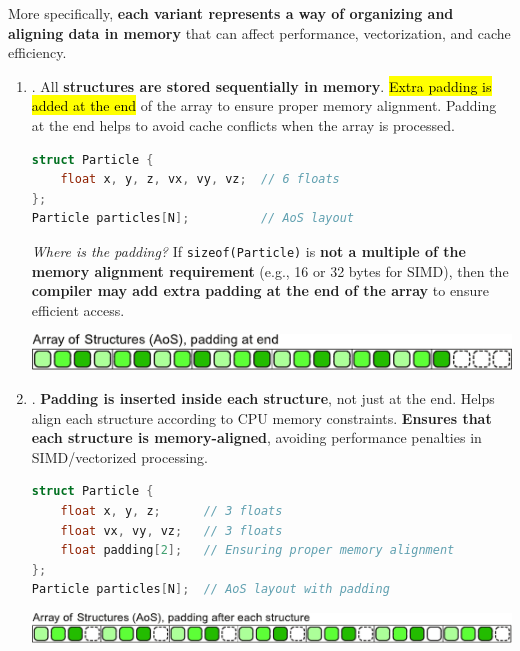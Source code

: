 \highspace
More specifically, \textbf{each variant represents a way of organizing and aligning data in memory} that can affect performance, vectorization, and cache efficiency.
\begin{enumerate}
    \item {}. All \textbf{structures are stored sequentially in memory}. \hl{Extra padding is added at the end} of the array to ensure proper memory alignment. Padding at the end helps to avoid cache conflicts when the array is processed.
    \begin{examplebox}
        \begin{lstlisting}[language=c++]
struct Particle {
    float x, y, z, vx, vy, vz;  // 6 floats
};
Particle particles[N];          // AoS layout\end{lstlisting}

        \emph{Where is the padding?} If \texttt{sizeof(Particle)} is \textbf{not a multiple of the memory alignment requirement} (e.g., 16 or 32 bytes for SIMD), then the \textbf{compiler may add extra padding at the end of the array} to ensure efficient access.

        \begin{center}
            \includegraphics[width=\textwidth]{img/aos-padding-end-1.pdf}
        \end{center}
    \end{examplebox}


    \item {}. \textbf{Padding is inserted inside each structure}, not just at the end. Helps align each structure according to CPU memory constraints. \textbf{Ensures that each structure is memory-aligned}, avoiding performance penalties in SIMD/vectorized processing.
    \newpage
    \begin{examplebox}
        \begin{lstlisting}[language=c++]
struct Particle {
    float x, y, z;      // 3 floats
    float vx, vy, vz;   // 3 floats
    float padding[2];   // Ensuring proper memory alignment
};
Particle particles[N];  // AoS layout with padding\end{lstlisting}
        \begin{center}
            \includegraphics[width=\textwidth]{img/aos-padding-each-struct-1.pdf}
        \end{center}
    \end{examplebox}



\end{enumerate}
